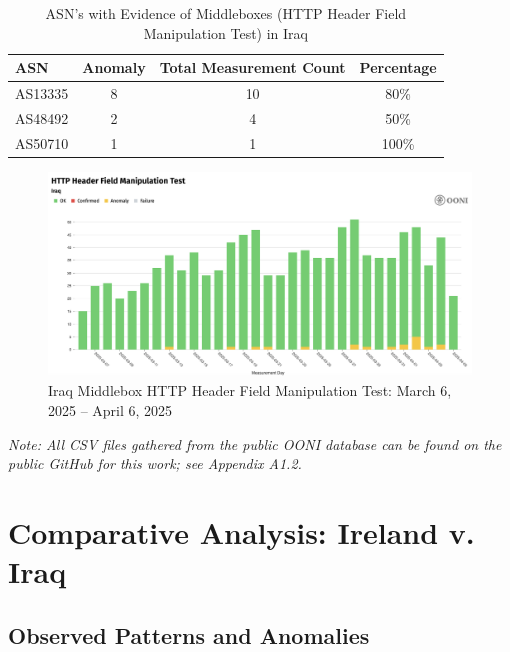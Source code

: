 \begin{table}[H]
\centering
\caption{ASN's with Evidence of Middleboxes (HTTP Header Field Manipulation Test) in Iraq}
\begin{tabular}{lccc}
\toprule
\textbf{ASN} & \textbf{Anomaly} & \textbf{Total Measurement Count} & \textbf{Percentage} \\
\midrule
AS13335   & 8 & 10 & 80\% \\
AS48492   & 2 & 4 & 50\% \\
AS50710   & 1 & 1 & 100\% \\
\bottomrule
\end{tabular}
\label{tab:category_block}
\end{table}

\begin{figure}[H]
    \centering
    \includegraphics[width=\textwidth]{Griff/TCD SCSS CAPSTONE/Results/IraqMiddleboxHTTPManipulation.png}
    \caption{Iraq Middlebox HTTP Header Field Manipulation Test: March 6, 2025 -- April 6, 2025}
    \label{fig:iraq-middlebox-HTTP-manipulation}
\end{figure}

\textit{Note: All CSV files gathered from the public OONI database can be found on the public GitHub for this work; see Appendix A1.2.}


\section{Comparative Analysis: Ireland v. Iraq}



\subsection{Observed Patterns and Anomalies}



